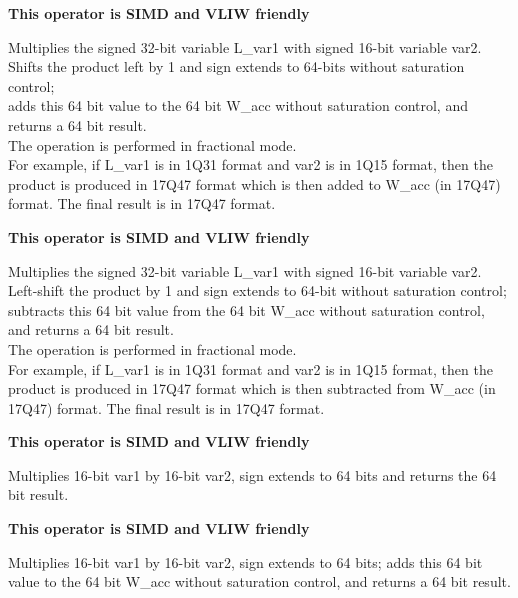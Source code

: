 \textbf{ This operator is SIMD and VLIW friendly}

Multiplies the signed 32-bit variable L\_var1 with signed 16-bit variable var2.
Shifts the product left by 1 and sign extends to 64-bits without saturation control;\\
adds this 64 bit value to the 64 bit W\_acc without saturation control, and returns a 64 bit result.\\
The operation is performed in fractional mode.\\
For example, if L\_var1 is in 1Q31 format and var2 is in 1Q15 format, then the product is produced in 17Q47 format which is then added to W\_acc (in 17Q47) format.
The final result is in 17Q47 format.


\textbf{ This operator is SIMD and VLIW friendly}

Multiplies the signed 32-bit variable L\_var1 with signed 16-bit variable var2.
Left-shift the product by 1 and sign extends to 64-bit without saturation control; subtracts this 64 bit value from the 64 bit W\_acc without saturation control, and returns a 64 bit result.\\
The operation is performed in fractional mode.\\
For example, if L\_var1 is in 1Q31 format and var2 is in 1Q15 format, then the product is produced in 17Q47 format which is then subtracted from W\_acc (in 17Q47) format.
The final result is in 17Q47 format.


\textbf{ This operator is SIMD and VLIW friendly}

Multiplies 16-bit var1 by 16-bit var2, sign extends to 64 bits and returns the 64 bit result.


\textbf{ This operator is SIMD and VLIW friendly}

Multiplies 16-bit var1 by 16-bit var2, sign extends to 64 bits; adds this 64 bit value to the 64 bit W\_acc without saturation control, and returns a 64 bit result.


